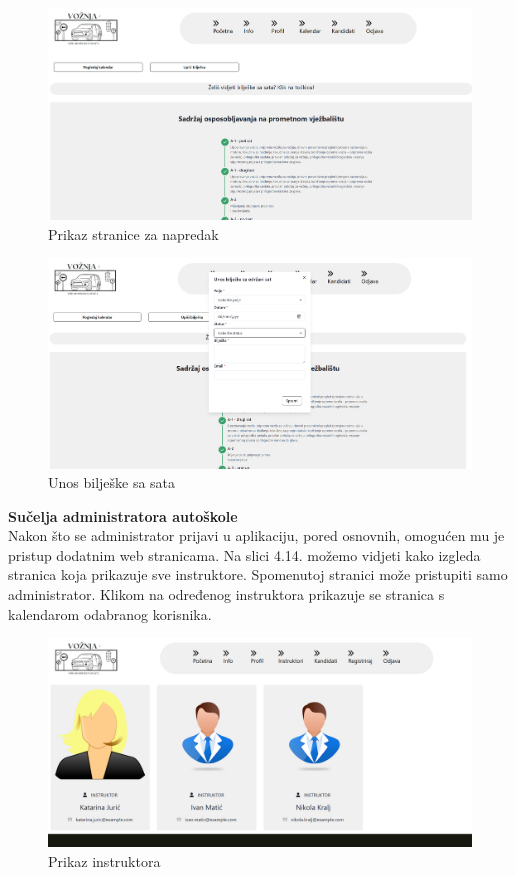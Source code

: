 \begin{figure}[H]
					\includegraphics[width=\textwidth]{slike/instruktor2.png} 
					\centering
					\caption{Prikaz stranice za napredak}
					\label{fig:promjene}
				\end{figure}
\begin{figure}[H]
					\includegraphics[width=\textwidth]{slike/instruktor3.png} 
					\centering
					\caption{Unos bilješke sa sata}
					\label{fig:promjene}
				\end{figure}

\noindent \textbf{Sučelja administratora autoškole }\\

\noindent Nakon što se administrator prijavi u aplikaciju, pored osnovnih, omogućen mu je pristup dodatnim web stranicama. Na slici 4.14. možemo vidjeti kako izgleda stranica koja prikazuje sve instruktore. Spomenutoj stranici može pristupiti samo administrator. Klikom na određenog instruktora prikazuje se stranica s kalendarom odabranog korisnika.

\begin{figure}[H]
					\includegraphics[width=\textwidth]{slike/admin1.png} 
					\centering
					\caption{Prikaz instruktora}
					\label{fig:promjene}
				\end{figure}

